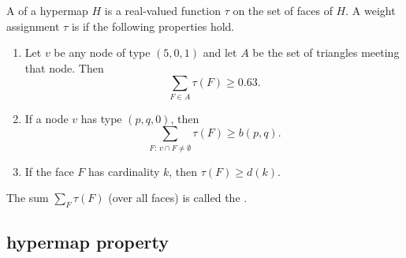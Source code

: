 \begin{definition}
%
  A  
of a hypermap $H$ is a real-valued
  function $\tau$ on the set of faces of $H$. A weight assignment
  $\tau$ is  if the following properties hold.
%
%
%
%
%
\begin{enumerate}
\item {} 
Let $v$ be any node of type $(5,0,1)$ and let
  $A$ be the set of triangles meeting that node.  Then
\[ \sum_{F\in A} \tau(F)
\ge  0.63.\] 
\item {}
 If a node $v$ has type $(p,q,0)$, then
  \[ \sum_{F:\,v\cap F\ne\emptyset} \tau(F) \ge
    b(p,q).\] 
\item {}
 If the face $F$ has cardinality $k$, then
$\tau(F) \ge d(k)$.
\end{enumerate}
%
%

The sum $\sum_F \tau(F)$ (over all faces) is called the . 
%
\end{definition}

\subsection{hypermap property}
\label{sec:graphproperty}



